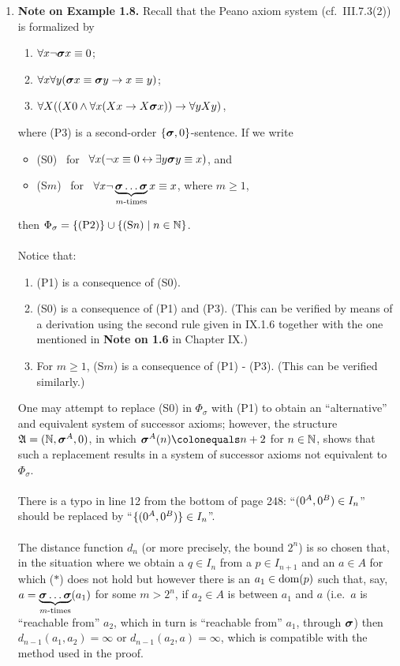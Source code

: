\begin{enumerate}[1.]
%
\item \textbf{Note on Example 1.8.} Recall that the Peano axiom system (cf.\ III.7.3(2)) is formalized by
\begin{enumerate}[(P1)]
\item $\forall x \neg \mbf{\sigma}x \equal 0$;
\item $\forall x \forall y (\mbf{\sigma}x \equal \mbf{\sigma}y \rightarrow x \equal y)$;
\item $\forall X ((X0 \land \forall x(Xx \rightarrow X \mbf{\sigma}x )) \rightarrow \forall y Xy)$,
\end{enumerate}
where (P3) is a second-order $\{ \mbf{\sigma}, 0 \}$-sentence. If we write
\begin{itemize}
\item (S0) \ for \ $\forall x (\neg x \equal 0 \liff \exists y \mbf{\sigma} y \equal x)$, and
\item (S$m$) \ for \ $\forall x \neg\underbrace{\enump{\mbf{\sigma}}{\mbf{\sigma}}}_{\text{\mathmode{m}-times}} x \equal x$, where $m \geq 1$,
\end{itemize}
then $\Phi_\sigma = \{ \mbox{(P2)} \} \cup \setm{\mbox{(S\mathmode{n})}}{n \in \nat}$.\\
\ \\
Notice that:
\begin{enumerate}[(1)]
\item (P1) is a consequence of (S0).
\item (S0) is a consequence of (P1) and (P3). (This can be verified by means of a derivation using the second rule given in IX.1.6 together with the one mentioned in \textbf{Note on 1.6} in Chapter IX.)
\item For $m \geq 1$, (S$m$) is a consequence of (P1) - (P3). (This can be verified similarly.)
\end{enumerate}
One may attempt to replace (S0) in $\Phi_\sigma$ with (P1) to obtain an ``alternative'' and equivalent system of successor axioms; however, the structure $\struct{A} = \tuple{\nat, \mbf{\sigma}^A, 0}$, in which $\mbf{\sigma}^A (n) \colonequals n + 2$ for $n \in \mathbb{N}$, shows that such a replacement results in a system of successor axioms not equivalent to $\Phi_\sigma$.\\
\ \\
There is a typo in line 12 from the bottom of page 248: ``$(0^A, 0^B) \in I_n$'' should be replaced by ``$\{ (0^A, 0^B) \} \in I_n$''.\\
\ \\
The distance function $d_n$ (or more precisely, the bound $2^n$) is so chosen that, in the situation where we obtain a $q \in I_n$ from a $p \in I_{n + 1}$ and an $a \in A$ for which ($\ast$) does not hold but however there is an $a_1 \in {\mathrm{dom}(p)}$ such that, say, $a = \underbrace{\enump{\mbf{\sigma}}{\mbf{\sigma}}}_\text{\mathmode{m}-times}(a_1)$ for some $m > 2^n$, if $a_2 \in A$ is between $a_1$ and $a$ (i.e.\ $a$ is ``reachable from'' $a_2$, which in turn is ``reachable from'' $a_1$, through $\mbf{\sigma}$) then $d_{n - 1}(a_1, a_2) = \infty$ or $d_{n - 1}(a_2, a) = \infty$, which is compatible with the method used in the proof.\\

\end{enumerate}
